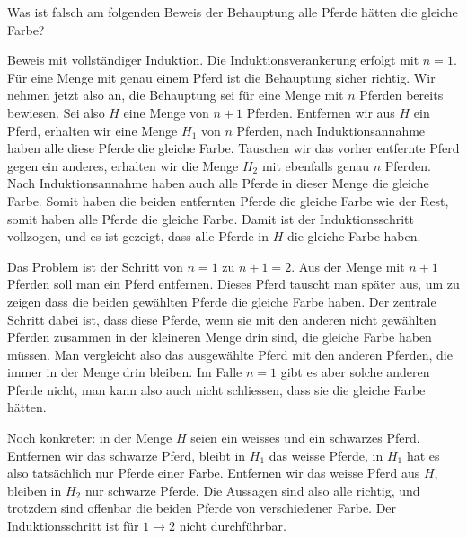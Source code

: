 Was ist falsch am folgenden Beweis der Behauptung alle Pferde hätten die
gleiche Farbe?

Beweis mit vollständiger Induktion. Die Induktionsverankerung
erfolgt mit $n=1$. Für eine Menge mit genau einem Pferd ist
die Behauptung sicher richtig. Wir nehmen jetzt also an, die
Behauptung sei für eine Menge mit $n$ Pferden bereits bewiesen.
Sei also $H$ eine Menge von $n+1$ Pferden. Entfernen wir aus $H$
ein Pferd, erhalten wir eine Menge $H_1$ von $n$ Pferden, nach
Induktionsannahme haben alle diese Pferde die gleiche Farbe.
Tauschen wir das vorher entfernte Pferd gegen ein anderes, erhalten
wir die Menge $H_2$ mit ebenfalls genau $n$ Pferden. Nach Induktionsannahme
haben auch alle Pferde in dieser Menge die gleiche Farbe. Somit
haben die beiden entfernten Pferde die gleiche Farbe wie der Rest,
somit haben alle Pferde die gleiche Farbe. Damit ist der Induktionsschritt
vollzogen, und es ist gezeigt, dass alle Pferde in $H$ die gleiche Farbe
haben.

\begin{loesung}
Das Problem ist der Schritt von $n=1$ zu $n+1=2$.
Aus der Menge mit $n+1$ Pferden soll man ein Pferd entfernen.
Dieses Pferd tauscht man später aus, um zu zeigen dass die
beiden gewählten Pferde die gleiche Farbe haben. Der zentrale
Schritt dabei ist, dass diese Pferde, wenn sie mit den anderen nicht
gewählten Pferden zusammen in der kleineren Menge drin sind,
die gleiche Farbe haben müssen. Man vergleicht also das ausgewählte
Pferd mit den anderen Pferden, die immer in der Menge drin bleiben.
Im Falle $n=1$ gibt es aber solche
anderen Pferde nicht, man kann also auch nicht schliessen, dass
sie die gleiche Farbe hätten.

Noch konkreter: in der Menge $H$ seien ein weisses und ein schwarzes Pferd.
Entfernen wir das schwarze Pferd, bleibt in $H_1$ das weisse Pferde,
in $H_1$ hat es also tatsächlich nur Pferde einer Farbe. Entfernen
wir das weisse Pferd aus $H$, bleiben in $H_2$ nur schwarze
Pferde. Die Aussagen sind also alle richtig, und trotzdem sind
offenbar die beiden Pferde von verschiedener Farbe. Der Induktionsschritt
ist für $1\to 2$ nicht durchführbar.
\end{loesung}
